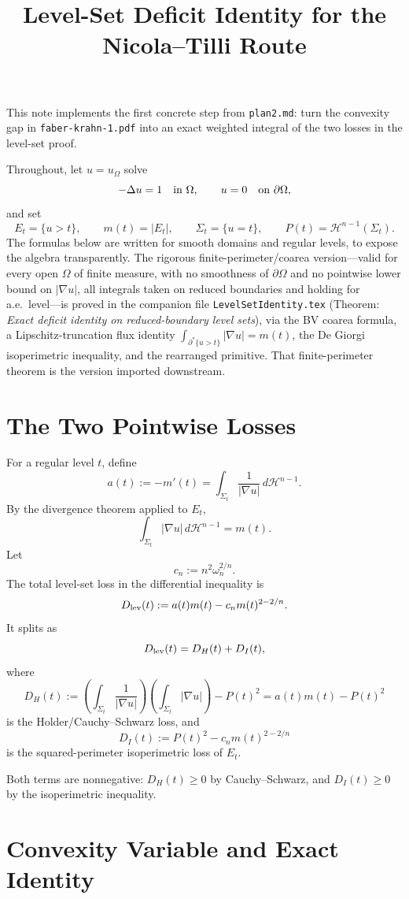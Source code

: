 \documentclass[11pt]{article}
\title{Level-Set Deficit Identity for the Nicola--Tilli Route}
\author{}
\date{}
\begin{document}
\maketitle

This note implements the first concrete step from \texttt{plan2.md}: turn the
convexity gap in \texttt{faber-krahn-1.pdf} into an exact weighted integral of
the two losses in the level-set proof.

Throughout, let \(u=u_\Omega\) solve
\[
-\Delta u=1 \quad\hbox{in }\Omega,\qquad
u=0\quad\hbox{on }\partial\Omega,
\]
and set
\[
E_t=\{u>t\},\qquad m(t)=|E_t|,\qquad
\Sigma_t=\{u=t\},\qquad P(t)=\mathcal H^{n-1}(\Sigma_t).
\]
The formulas below are written for smooth domains and regular levels, to expose
the algebra transparently. The rigorous finite-perimeter/coarea version---valid
for every open \(\Omega\) of finite measure, with no smoothness of
\(\partial\Omega\) and no pointwise lower bound on \(|\nabla u|\), all integrals
taken on reduced boundaries and holding for a.e.\ level---is proved in the
companion file \texttt{LevelSetIdentity.tex} (Theorem: \emph{Exact deficit
identity on reduced-boundary level sets}), via the BV coarea formula, a
Lipschitz-truncation flux identity \(\int_{\partial^*\{u>t\}}|\nabla u|=m(t)\),
the De Giorgi isoperimetric inequality, and the rearranged primitive. That
finite-perimeter theorem is the version imported downstream.

\section{The Two Pointwise Losses}

For a regular level \(t\), define
\[
a(t):=-m'(t)=\int_{\Sigma_t}\frac{1}{|\nabla u|}\,d\mathcal H^{n-1}.
\]
By the divergence theorem applied to \(E_t\),
\[
\int_{\Sigma_t}|\nabla u|\,d\mathcal H^{n-1}=m(t).
\]
Let
\[
c_n:=n^2\omega_n^{2/n}.
\]
The total level-set loss in the differential inequality is
\[
D_{\rm lev}(t):=a(t)m(t)-c_n m(t)^{2-2/n}.
\]
It splits as
\[
D_{\rm lev}(t)=D_H(t)+D_I(t),
\]
where
\[
D_H(t)
:=
\left(\int_{\Sigma_t}\frac{1}{|\nabla u|}\right)
\left(\int_{\Sigma_t}|\nabla u|\right)-P(t)^2
=a(t)m(t)-P(t)^2
\]
is the Holder/Cauchy--Schwarz loss, and
\[
D_I(t):=P(t)^2-c_n m(t)^{2-2/n}
\]
is the squared-perimeter isoperimetric loss of \(E_t\).

Both terms are nonnegative: \(D_H(t)\ge0\) by Cauchy--Schwarz, and
\(D_I(t)\ge0\) by the isoperimetric inequality.

\section{Convexity Variable and Exact Identity}
\end{document}
